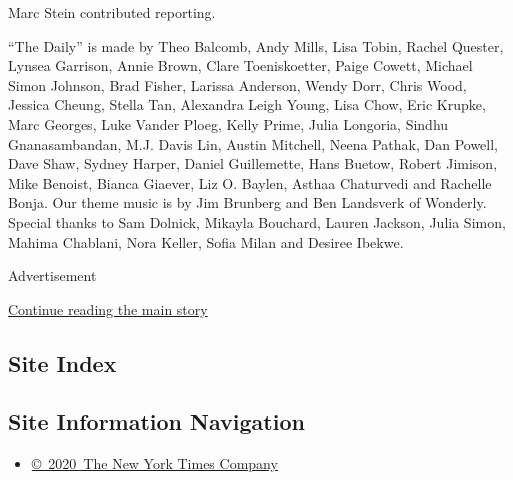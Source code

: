 Marc Stein contributed reporting.

``The Daily'' is made by Theo Balcomb, Andy Mills, Lisa Tobin, Rachel
Quester, Lynsea Garrison, Annie Brown, Clare Toeniskoetter, Paige
Cowett, Michael Simon Johnson, Brad Fisher, Larissa Anderson, Wendy
Dorr, Chris Wood, Jessica Cheung, Stella Tan, Alexandra Leigh Young,
Lisa Chow, Eric Krupke, Marc Georges, Luke Vander Ploeg, Kelly Prime,
Julia Longoria, Sindhu Gnanasambandan, M.J. Davis Lin, Austin Mitchell,
Neena Pathak, Dan Powell, Dave Shaw, Sydney Harper, Daniel Guillemette,
Hans Buetow, Robert Jimison, Mike Benoist, Bianca Giaever, Liz O.
Baylen, Asthaa Chaturvedi and Rachelle Bonja. Our theme music is by Jim
Brunberg and Ben Landsverk of Wonderly. Special thanks to Sam Dolnick,
Mikayla Bouchard, Lauren Jackson, Julia Simon, Mahima Chablani, Nora
Keller, Sofia Milan and Desiree Ibekwe.

Advertisement

\protect\hyperlink{after-bottom}{Continue reading the main story}

\hypertarget{site-index}{%
\subsection{Site Index}\label{site-index}}

\hypertarget{site-information-navigation}{%
\subsection{Site Information
Navigation}\label{site-information-navigation}}

\begin{itemize}
\tightlist
\item
  \href{https://help.nytimes3xbfgragh.onion/hc/en-us/articles/115014792127-Copyright-notice}{©~2020~The
  New York Times Company}
\end{itemize}

